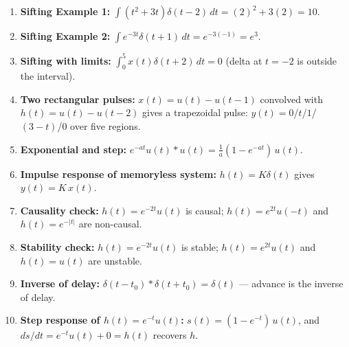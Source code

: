 \documentclass[11pt]{article}
\begin{document}
\begin{enumerate}
  \item \textbf{Sifting Example 1:} $\int (t^2+3t)\delta(t-2)\,dt = (2)^2 + 3(2) = 10$.
  \item \textbf{Sifting Example 2:} $\int e^{-3t}\delta(t+1)\,dt = e^{-3(-1)} = e^3$.
  \item \textbf{Sifting with limits:} $\int_0^5 x(t)\delta(t+2)\,dt = 0$ (delta at $t=-2$ is outside the interval).
  \item \textbf{Two rectangular pulses:} $x(t)=u(t)-u(t-1)$ convolved with $h(t)=u(t)-u(t-2)$ gives a trapezoidal pulse: $y(t) = 0$/$t$/$1$/$(3-t)$/$0$ over five regions.
  \item \textbf{Exponential and step:} $e^{-at}u(t) * u(t) = \frac{1}{a}(1 - e^{-at})\,u(t)$.
  \item \textbf{Impulse response of memoryless system:} $h(t) = K\delta(t)$ gives $y(t) = K\,x(t)$.
  \item \textbf{Causality check:} $h(t) = e^{-2t}u(t)$ is causal; $h(t) = e^{2t}u(-t)$ and $h(t) = e^{-|t|}$ are non-causal.
  \item \textbf{Stability check:} $h(t)=e^{-2t}u(t)$ is stable; $h(t)=e^{2t}u(t)$ and $h(t)=u(t)$ are unstable.
  \item \textbf{Inverse of delay:} $\delta(t-t_0) * \delta(t+t_0) = \delta(t)$ — advance is the inverse of delay.
  \item \textbf{Step response of $h(t)=e^{-t}u(t)$:} $s(t) = (1 - e^{-t})\,u(t)$, and $ds/dt = e^{-t}u(t) + 0 = h(t)$ recovers $h$.
\end{enumerate}
\end{document}
